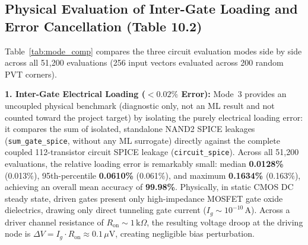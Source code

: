 \documentclass[11pt,a4paper]{article}
\numberwithin{table}{section}
\numberwithin{figure}{section}
\begin{document}
\subsection{Physical Evaluation of Inter-Gate Loading and Error Cancellation (Table 10.2)}
Table~\ref{tab:mode_comp} compares the three circuit evaluation modes side by side across all 51,200 evaluations (256 input vectors evaluated across 200 random PVT corners).

\begin{table}[H]
\centering
\caption{Comparison of Circuit Evaluation Modes Across 51,200 Runs}
\label{tab:mode_comp}
\end{table}

\textbf{1. Inter-Gate Electrical Loading ($< 0.02\%$ Error):}
Mode~3 provides an uncoupled physical benchmark (diagnostic only, not an ML result and not counted toward the project target) by isolating the purely electrical loading error: it compares the sum of isolated, standalone NAND2 SPICE leakages (\texttt{sum\_gate\_spice}, without any ML surrogate) directly against the complete coupled 112-transistor circuit SPICE leakage (\texttt{circuit\_spice}). Across all 51,200 evaluations, the relative loading error is remarkably small: median \textbf{0.0128\%} (0.013\%), 95th-percentile \textbf{0.0610\%} (0.061\%), and maximum \textbf{0.1634\%} (0.163\%), achieving an overall mean accuracy of \textbf{99.98\%}. Physically, in static CMOS DC steady state, driven gates present only high-impedance MOSFET gate oxide dielectrics, drawing only direct tunneling gate current ($I_g \sim 10^{-10}\,\mathrm{A}$). Across a driver channel resistance of $R_{\mathrm{on}} \sim 1\,\mathrm{k}\Omega$, the resulting voltage droop at the driving node is $\Delta V = I_g \cdot R_{\mathrm{on}} \approx 0.1\,\mu\mathrm{V}$, creating negligible bias perturbation.
\end{document}
